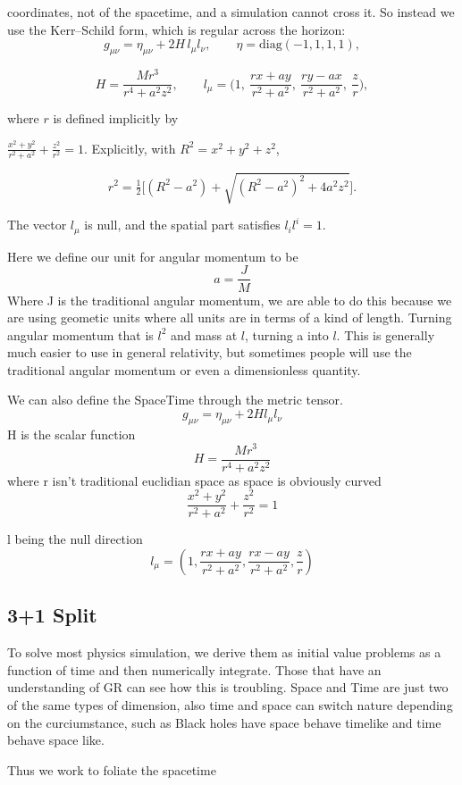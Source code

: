 coordinates, not of the spacetime, and a simulation cannot cross it. So instead we use
the Kerr--Schild form, which is regular across the horizon:
\[
	g_{\mu\nu}=\eta_{\mu\nu}+2H\,l_\mu l_\nu,\qquad \eta=\mathrm{diag}(-1,1,1,1),
\]

\[
	H=\frac{Mr^3}{r^4+a^2z^2},\qquad
	l_\mu=\Big(1,\ \frac{rx+ay}{r^2+a^2},\ \frac{ry-ax}{r^2+a^2},\ \frac{z}{r}\Big),
\]

where $r$ is defined implicitly by

$\frac{x^2+y^2}{r^2+a^2}+\frac{z^2}{r^2}=1$. Explicitly, with $R^2=x^2+y^2+z^2$,

\[
	r^2=\tfrac12\Big[(R^2-a^2)+\sqrt{(R^2-a^2)^2+4a^2z^2}\Big].
\]

The vector $l_\mu$ is null, and the spatial part satisfies $l_il^i=1$.

Here we define our unit for angular momentum to be
\[
	a = \frac{J}{M}
\]
Where J is the traditional angular momentum, we are able to do this because we are using geometic units where all units are in terms of a kind of length. Turning angular momentum that is $l^2$ and mass at $l$, turning a into $l$. This is generally much easier to use in general relativity, but sometimes people will use the traditional angular momentum or even a dimensionless quantity.

We can also define the SpaceTime through the metric tensor.
\[
	g_{\mu \nu} = \eta_{\mu \nu} + 2H l_\mu l_\nu
\]
H is the scalar function
\[
	H = \frac{Mr^3}{r^4 + a^2 z^2}
\]
where r isn't traditional euclidian space as space is obviously curved
\[
	\frac{x^2 + y^2}{r^2 + a^2} + \frac{z^2}{r^2 } = 1
\]

l being the null direction
\[
	l_\mu = \left(1, \frac{rx + ay}{r^2 + a^2},\frac{rx - ay}{r^2 + a^2}, \frac{z}{r}  \right)
\]

\subsection{3+1 Split}

To solve most physics simulation, we derive them as initial value problems as a function of time and then numerically integrate. Those that have an understanding of GR can see how this is troubling. Space and Time are just two of the same types of dimension, also time and space can switch nature depending on the curciumstance, such as Black holes have space behave timelike and time behave space like.

Thus we work to foliate the spacetime

